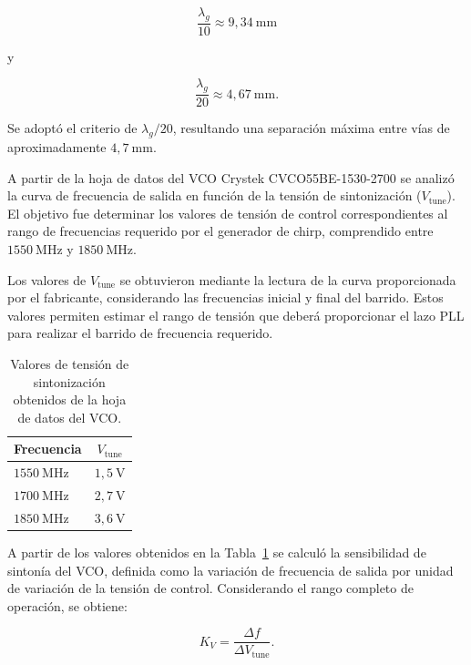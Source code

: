 \begin{equation}
\frac{\lambda_g}{10} \approx 9{,}34~\mathrm{mm}
\end{equation}

y

\begin{equation}
\frac{\lambda_g}{20} \approx 4{,}67~\mathrm{mm}.
\end{equation}

Se adoptó el criterio de $\lambda_g/20$, resultando una separación máxima entre vías de aproximadamente $4{,}7~\mathrm{mm}$.


A partir de la hoja de datos del VCO Crystek CVCO55BE-1530-2700 se analizó la curva de frecuencia de salida en función de la tensión de sintonización ($V_{\text{tune}}$). El objetivo fue determinar los valores de tensión de control correspondientes al rango de frecuencias requerido por el generador de chirp, comprendido entre $1550~\mathrm{MHz}$ y $1850~\mathrm{MHz}$.

Los valores de $V_{\text{tune}}$ se obtuvieron mediante la lectura de la curva proporcionada por el fabricante, considerando las frecuencias inicial y final del barrido. Estos valores permiten estimar el rango de tensión que deberá proporcionar el lazo PLL para realizar el barrido de frecuencia requerido.

\begin{table}[h]
\centering
\begin{tabular}{lc}
\hline
\textbf{Frecuencia} & \textbf{$V_{\text{tune}}$} \\
\hline
$1550~\mathrm{MHz}$ & $1{,}5~\mathrm{V}$ \\
$1700~\mathrm{MHz}$ & $2{,}7~\mathrm{V}$ \\
$1850~\mathrm{MHz}$ & $3{,}6~\mathrm{V}$ \\
\hline
\end{tabular}
\caption{Valores de tensión de sintonización obtenidos de la hoja de datos del VCO.}
\label{tab:vtune_datasheet}
\end{table}

A partir de los valores obtenidos en la Tabla~\ref{tab:vtune_datasheet} se calculó la sensibilidad de sintonía del VCO, definida como la variación de frecuencia de salida por unidad de variación de la tensión de control. Considerando el rango completo de operación, se obtiene:

\begin{equation}
K_V = \frac{\Delta f}{\Delta V_{\text{tune}}}.
\end{equation}

